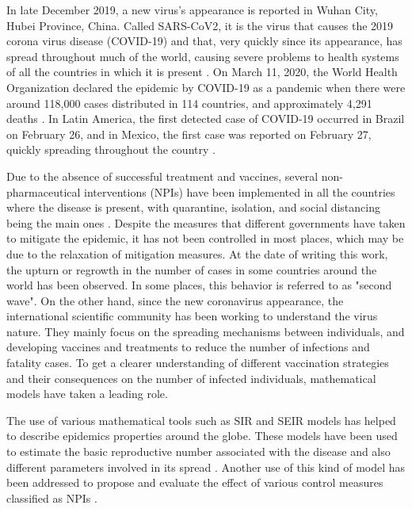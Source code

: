 In late December 2019, a new virus's appearance is reported in Wuhan City,
Hubei Province, China. Called SARS-CoV2, it is the virus that causes the 2019
corona virus disease (COVID-19) and that, very quickly since its appearance,
has spread throughout much of the world, causing severe problems to health
systems of all the countries in which it is present \cite{Who12020}. On March
11, 2020, the World Health Organization declared the epidemic by COVID-19 as a
pandemic when there were around 118,000 cases distributed in 114 countries, and
approximately 4,291 deaths \cite{Who512020}. In Latin America, the first
detected case of COVID-19 occurred in Brazil on February 26, and in Mexico, the
first case was reported on February 27, quickly spreading throughout the
country \cite{Ajrm2020,Acuna2020}.

Due to the absence of successful treatment and vaccines,
several non-pharmaceutical interventions (NPIs) have been implemented in all the
countries where the disease is present, with quarantine, isolation, and social
distancing being the main ones \cite{Wilder2020,Guner2020,Liu2020_2}. Despite
the measures that different governments have taken to mitigate the epidemic, it
has not been controlled in most places, which may be due to the relaxation of
mitigation measures. At the date of writing this work, the upturn or regrowth
in the number of cases in some countries around the world has been observed. In
some places, this behavior is referred to as "second wave". On the other hand,
since the new coronavirus appearance, the international scientific community
has been working to understand the virus nature. They mainly focus on the
spreading mechanisms between individuals, and developing vaccines and
treatments to reduce the number of infections and fatality cases. To get a
clearer understanding of different vaccination strategies and their
consequences on the number of infected individuals, mathematical models have
taken a leading role.

    The use of various mathematical tools such as SIR and SEIR models has
helped to  describe epidemics properties around the globe. These models have
been used to estimate the basic reproductive number associated with the disease
and also different parameters involved in its spread
\cite{Wang2020,Liu2020,Sarkar2020,Hong2020}. Another use of this kind of model
has been addressed to propose and evaluate the effect of various control
measures classified as NPIs
\cite{Acuna2020,Marimuthu2020,Liu2020,Shaikh2020,DeVisscher2020}.

